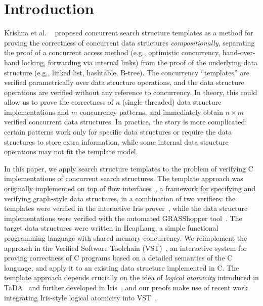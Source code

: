 \documentclass[sigplan,10pt,anonymous,review]{acmart}\settopmatter{printfolios=true,printccs=false,printacmref=false}
\newcommand{\wm}[1]{\textbf{\textcolor{violet}{[William: #1]}}}
\begin{document}
\maketitle

\section{Introduction}
\label{sec:introduction}
Krishna et al. ~\cite{templates} proposed concurrent search structure templates as a method for proving the correctness of concurrent data structures \emph{compositionally}, separating the proof of a concurrent access method (e.g., optimistic concurrency, hand-over-hand locking, forwarding via internal links) from the proof of the underlying data structure (e.g., linked list, hashtable, B-tree). The concurrency ``templates'' are verified parametrically over data structure operations, and the data structure operations are verified without any reference to concurrency. In theory, this could allow us to prove the correctness of $n$ (single-threaded) data structure implementations and $m$ concurrency patterns, and immediately obtain $n \times m$ verified concurrent data structures. In practice, the story is more complicated: certain patterns work only for specific data structures or require the data structures to store extra information, while some internal data structure operations may not fit the template model. %


In this paper, we apply search structure templates to the problem of verifying C implementations of concurrent search structures. The template approach was originally implemented on top of flow interfaces~\cite{krishna2017flow}, a framework for specifying and verifying graph-style data structures, in a combination of two verifiers: the templates were verified in the interactive Iris prover~\cite{iris}, while the data structure implementations were verified with the automated GRASShopper tool~\cite{grasshopper}. The target data structures were written in HeapLang, a simple functional programming language with shared-memory concurrency. We reimplement the approach in the Verified Software Toolchain (VST)~\cite{plcc}, an interactive system for proving correctness of C programs based on a detailed semantics of the C language, and apply it to an existing data structure implemented in C. The template approach depends crucially on the idea of \emph{logical atomicity} introduced in TaDA~\cite{tada} and further developed in Iris~\cite{iris}, and our proofs make use of recent work integrating Iris-style logical atomicity into VST~\cite{iris-vst-arxiv}. %
\end{document}
